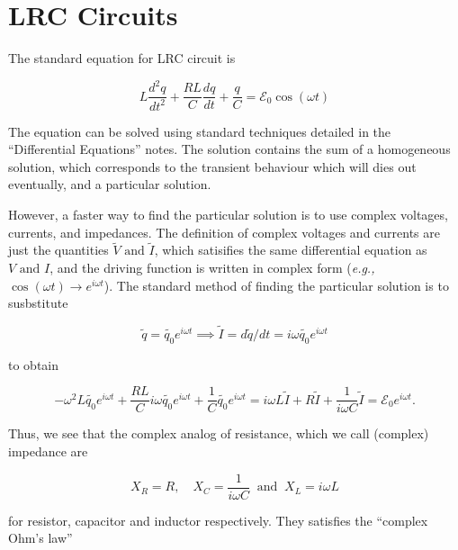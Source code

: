 \documentclass[english,a4paper,12pt]{report}
\begin{document}
\section{LRC Circuits}

The standard equation for LRC circuit is 

\begin{equation}
     L\frac{d^2q}{dt^2} + \frac{RL}{C}\frac{dq}{dt} + \frac{q}{C} = \mathcal{E}_{0}\cos (\omega t) 
\end{equation}

The equation can be solved using standard techniques detailed in the ``Differential Equations'' notes. The solution contains the sum of a homogeneous solution, which corresponds to the transient behaviour which will dies out eventually, and a particular solution. 

However, a faster way to find the particular solution is to use complex voltages, currents, and impedances. The definition of complex voltages and currents are just the quantities \(\tilde{V} \text { and } \tilde{I} \), which satisifies the same differential equation as \(V \text { and } I\), and the driving function is written in complex form (\textit{e.g.,} \(\cos (\omega t) \to e^{i \omega t} \)). The standard method of finding the particular solution is to susbstitute 

\begin{equation}
    \tilde{q}  = \tilde{q_0 }e^{i \omega t} \implies \tilde{I} = d \tilde{q} /dt = i \omega \tilde{q_0 } e^{i \omega t}
\end{equation}

to obtain

\begin{equation}
    -\omega ^2 L \tilde{q_0 }e^{i \omega t} + \frac{RL}{C} i \omega \tilde{q_0 } e^{i \omega t} + \frac{1}{C} \tilde{q_0 }e^{i \omega t} = i \omega L \tilde{I} + R \tilde{I} + \frac{1}{i \omega C} \tilde{I} = \mathcal{E}_{0}e^{i \omega t}.        
\end{equation}

Thus, we see that the complex analog of resistance, which we call (complex) impedance are 

\begin{equation}
    X_{R} = R,\quad  X_{C} = \frac{1}{i\omega C}  ~\text { and }~ X_{L} = i \omega L 
\end{equation}

for resistor, capacitor and inductor respectively. They satisfies the ``complex Ohm's law'' 
\end{document}
